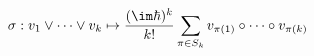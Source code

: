 \begin{equation}
    \label{eq:symPBW}
    \sigma: v_1 \vee \cdots \vee v_k 
    \mapsto \frac{(\im\hbar)^k}{k!} 
    \sum_{\pi \in S_k} v_{\pi(1)} \circ \cdots \circ v_{\pi(k)}
\end{equation}

